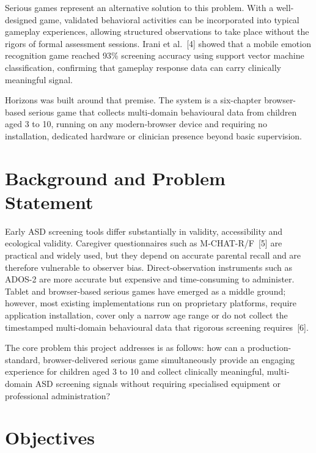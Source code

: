 \documentclass[12pt,a4paper,oneside]{report}
\begin{document}
	Serious games represent an alternative solution to this problem. With a well-designed game, validated behavioral activities can be incorporated into typical gameplay experiences, allowing structured observations to take place without the rigors of formal assessment sessions. Irani et al.~[4] showed that a mobile emotion recognition game reached 93\% screening accuracy using support vector machine classification, confirming that gameplay response data can carry clinically meaningful signal.
	
	Horizons was built around that premise. The system is a six-chapter browser-based serious game that collects multi-domain behavioural data from children aged 3 to 10, running on any modern-browser device and requiring no installation, dedicated hardware or clinician presence beyond basic supervision.
	
	\section{Background and Problem Statement}
	
	Early ASD screening tools differ substantially in validity, accessibility and ecological validity. Caregiver questionnaires such as M-CHAT-R/F~[5] are practical and widely used, but they depend on accurate parental recall and are therefore vulnerable to observer bias. Direct-observation instruments such as ADOS-2 are more accurate but expensive and time-consuming to administer. Tablet and browser-based serious games have emerged as a middle ground; however, most existing implementations run on proprietary platforms, require application installation, cover only a narrow age range or do not collect the timestamped multi-domain behavioural data that rigorous screening requires~[6].
	
	The core problem this project addresses is as follows: how can a production-standard, browser-delivered serious game simultaneously provide an engaging experience for children aged 3 to 10 and collect clinically meaningful, multi-domain ASD screening signals without requiring specialised equipment or professional administration?
	
	\section{Objectives}
	
\end{document}
